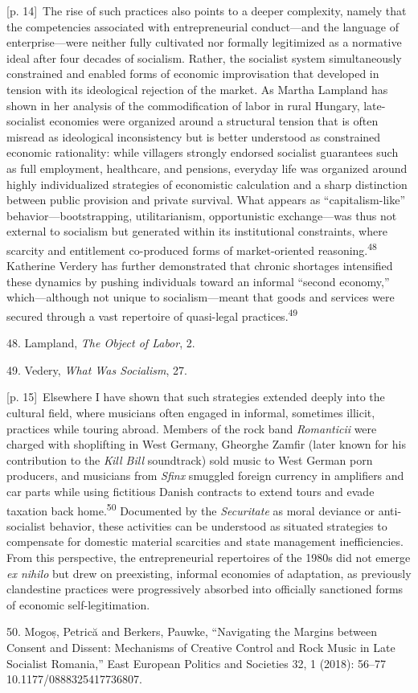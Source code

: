 \documentclass[10pt,a4paper]{article}
\begin{document}
{\scriptsize\color{gray} [p. 14]}\ The rise of such practices also points to a deeper complexity, namely that the competencies associated with entrepreneurial conduct—and the language of enterprise—were neither fully cultivated nor formally legitimized as a normative ideal after four decades of socialism. Rather, the socialist system simultaneously constrained and enabled forms of economic improvisation that developed in tension with its ideological rejection of the market. As Martha Lampland has shown in her analysis of the commodification of labor in rural Hungary, late-socialist economies were organized around a structural tension that is often misread as ideological inconsistency but is better understood as constrained economic rationality: while villagers strongly endorsed socialist guarantees such as full employment, healthcare, and pensions, everyday life was organized around highly individualized strategies of economistic calculation and a sharp distinction between public provision and private survival. What appears as “capitalism-like” behavior—bootstrapping, utilitarianism, opportunistic exchange—was thus not external to socialism but generated within its institutional constraints, where scarcity and entitlement co-produced forms of market-oriented reasoning.\nobreak\textsuperscript{48} Katherine Verdery has further demonstrated that chronic shortages intensified these dynamics by pushing individuals toward an informal “second economy,” which—although not unique to socialism—meant that goods and services were secured through a vast repertoire of quasi-legal practices.\nobreak\textsuperscript{49}\par{\small 48. Lampland, \textit{The Object of Labor}, 2.\par}{\small 49. Vedery, \textit{What Was Socialism}, 27.\par}
{\scriptsize\color{gray} [p. 15]}\ Elsewhere I have shown that such strategies extended deeply into the cultural field, where musicians often engaged in informal, sometimes illicit, practices while touring abroad. Members of the rock band \textit{Romanticii} were charged with shoplifting in West Germany, Gheorghe Zamfir (later known for his contribution to the \textit{Kill Bill} soundtrack) sold music to West German porn producers, and musicians from \textit{Sfinx} smuggled foreign currency in amplifiers and car parts while using fictitious Danish contracts to extend tours and evade taxation back home.\nobreak\textsuperscript{50} Documented by the \textit{Securitate} as moral deviance or anti-socialist behavior, these activities can be understood as situated strategies to compensate for domestic material scarcities and state management inefficiencies. From this perspective, the entrepreneurial repertoires of the 1980s did not emerge \textit{ex nihilo} but drew on preexisting, informal economies of adaptation, as previously clandestine practices were progressively absorbed into officially sanctioned forms of economic self-legitimation.\par{\small 50. Mogoș, Petrică and Berkers, Pauwke, “Navigating the Margins between Consent and Dissent: Mechanisms of Creative Control and Rock Music in Late Socialist Romania,” East European Politics and Societies 32, 1 (2018): 56–77 10.1177/0888325417736807.\par}
\end{document}
